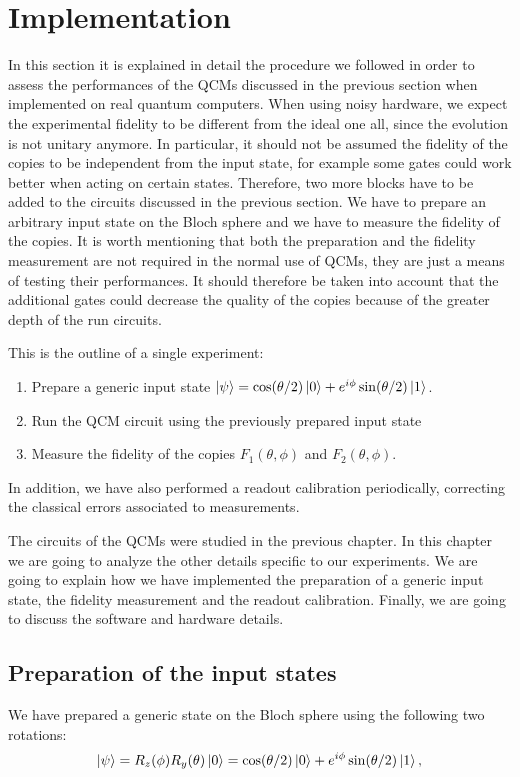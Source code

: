 \chapter{Implementation}
\label{sec:implementation}

In this section it is explained in detail the procedure we followed in order to assess the performances of the QCMs discussed in the previous section when implemented on real quantum computers.
When using noisy hardware, we expect the experimental fidelity to be different from the ideal one all, since the evolution is not unitary anymore.
In particular, it should not be assumed the fidelity of the copies to be independent from the input state, for example some gates could work better when acting on certain states.
Therefore, two more blocks have to be added to the circuits discussed in the previous section. 
We have to prepare an arbitrary input state on the Bloch sphere and we have to measure the fidelity of the copies.
It is worth mentioning that both the preparation and the fidelity measurement are not required in the normal use of QCMs, they are just a means of testing their performances.
It should therefore be taken into account that the additional gates could decrease the quality of the copies because of the greater depth of the run circuits.

This is the outline of a single experiment:
\begin{enumerate}
    \item Prepare a generic input state $\ket{\psi}=\cos(\theta/2)\ket{0}+e^{i\phi}\sin(\theta/2)\ket{1}$.
    \item Run the QCM circuit using the previously prepared input state
    \item Measure the fidelity of the copies $F_{1}(\theta,\phi)$ and $F_{2}(\theta,\phi)$.
\end{enumerate}
In addition, we have also performed a readout calibration periodically, correcting the classical errors associated to measurements.

The circuits of the QCMs were studied in the previous chapter. In this chapter we are going to analyze the other details specific to our experiments.
We are going to explain how we have implemented the preparation of a generic input state, the fidelity measurement and the readout calibration.
Finally, we are going to discuss the software and hardware details.


\section{Preparation of the input states}
We have prepared a generic state on the Bloch sphere using the following two rotations:
\[
    \ket{\psi}=R_z(\phi)R_y(\theta)\ket{0}=\cos(\theta/2)\ket{0}+e^{i\phi}\sin(\theta/2)\ket{1},
\]

